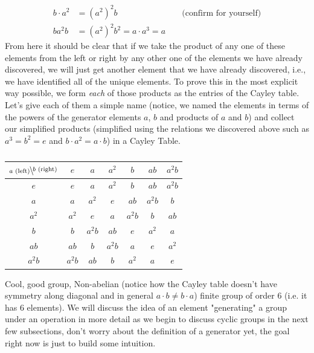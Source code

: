 \begin{example}
\begin{align}
b\cdot a^2&= (a^2)^2 b \ \ \ \ \ \ \ \ \ \ \ \ \ \ \ \ \ \ \ \ \ \ \ \ \ \ \ \ \ \ \ \ \ \text{ (confirm for yourself)} \nonumber \\
ba^2b&= (a^2)^2b^2=a\cdot a^3=a \nonumber
\end{align}
From here it should be clear that if we take the product of any one of these elements from the left
or right by any other one of the elements we have already discovered, we will just get another
element that we have already discovered, i.e., we have identified all of the unique elements. To
prove this in the most explicit way possible, we form \textit{each} of those products as the entries
of the Cayley table. Let's give each of them a simple name (notice, we named the elements in terms
of the powers of the generator elements $a$, $b$ and products of $a$ and $b$) and collect our
simplified products (simplified using the relations we discovered above such as $a^3=b^2=e$ and
$b\cdot a^2=a\cdot b$) in a Cayley Table.
\begin{table}[ht!]
    \centering
    \begin{tabular}{c||c|c|c|c|c|c|}
         $\bsfrac{b\text{ (right)}}{a\text{ (left)}}$& $e$&$a$&$a^2$&$b$&$ab$&$a^2b$  \\ \hline \hline
         $e$&$e$&$a$&$a^2$&$b$&$ab$&$a^2b$  \\ \hline
         $a$&$a$&$a^2$&$e$&$ab$&$a^2b$& $b$\\ \hline
         $a^2$&$a^2$&$e$&$a$&$a^2b$ &$b$ &$ab$  \\ \hline
         $b$&$b$& $a^2b$&$ab$ &$e$ &$a^2$ &$a$ \\ \hline
         $ab$ & $ab$ &$b$ &$a^2b$ &$a$ &$e$ &$a^2$   \\ \hline
         $a^2b$ & $a^2b$ & $ab$ &$b$ &$a^2$ &$a$ &$e$   \\ \hline
    \end{tabular}
    \caption{}
    \label{tab:Cayley_from_generators}
\end{table}

Cool, good group, Non-abelian (notice how the Cayley table doesn't have symmetry along diagonal and
in general $a\cdot b \neq b\cdot a$) finite group of order 6 (i.e. it has 6 elements). We will
discuss the idea of an element "generating" a group under an operation in more detail as we begin to
discuss cyclic groups in the next few subsections, don't worry about the definition of a generator
yet, the goal right now is just to build some intuition.
\end{example}
\newpage
